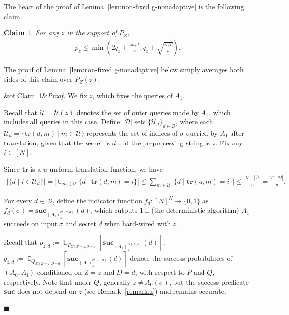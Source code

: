 \documentclass[11pt]{article}
\renewenvironment{proof}[1][]
    {\noindent
       \ifx&#1&{\it Proof.}
       \else{\it Proof ({#1}).}
       \fi}{\hfill $\blacksquare$}
\newtheorem{claim}[theorem]{Claim}
\DeclareMathOperator*{\E}{\mathbb{E}}
\newcommand{\SECS}{{\mathcal{D}}}
\newcommand{\secv}{{d}}
\newcommand{\SECV}{{D}}
\newcommand{\SUC}{\boldsymbol{suc}}
\newcommand{\TR}{\boldsymbol{tr}}
\begin{document}
The heart of the proof of Lemma~\ref{lem:non-fixed g-nonadaptive} is the following claim.
\begin{claim} \label{clm:non-fixed main-eq2}
For any $z$ in the support of $P_{Z}$,
\begin{align*} 
p_{z}
\leq 
\min \left(2 q_{z} 
+ 
\frac{4 \kappa_{z} T }{u},
q_{z} + \sqrt{\frac{\kappa_{z} T }{u}} \right).
\end{align*}
\end{claim}
The proof of Lemma~\ref{lem:non-fixed g-nonadaptive} below simply averages both sides of this claim over $P_{Z}(z)$.

\medskip

\begin{proof}[of Claim~\ref{clm:non-fixed main-eq2}]
We fix $z$, which fixes the queries of $A_1$.

Recall that $\mathcal{U} = \mathcal{U}(z)$ denotes the set of outer queries made by $A_1$, which includes all queries in this case. Define $|\SECS|$ sets $\{\mathcal{U}_\secv\}_{\secv \in \SECS}$,
where each $\mathcal{U}_\secv = \{ \TR(\secv,m) \mid m \in \mathcal{U}\}$ represents the set of indices of $\sigma$ queried by $A_1$ after translation, given that the secret is $\secv$ and the preprocessing string is $z$.
Fix any $i \in [N]$.

Since $\TR$ is a $u$-uniform translation function, we have
\begin{align} \label{eq:non-fixed readt2}
|\{\secv \mid i \in \mathcal{U}_\secv\}|
= | \cup_{m \in \mathcal{U}} \{ \secv \mid \TR(\secv,m) = i \} |
\leq \sum_{m \in \mathcal{U}} | \{ \secv \mid \TR(\secv,m) = i \} |
\le \frac{|\mathcal{U}| \cdot |\SECS|}{u} = \frac{T \cdot |\SECS|}{u}.
\end{align}



For every $\secv \in \SECS$, define the indicator function $f_\secv:[N]^{N} \to \{0,1\}$
as 
$f_\secv(\sigma) = 
\SUC_{(A_1)_{z}^{\mathcal{O}(\sigma,\secv)}}(\secv)$,
which outputs $1$ if
(the deterministic algorithm) $A_1$ succeeds on input $\sigma$ and secret $\secv$ when hard-wired with $z$. 

Recall that 
$p_{z,\secv} := \E_{P_{\Sigma \mid Z=z, \SECV = \secv}}[\SUC_{(A_1)_{z}^{\mathcal{O}(\Sigma,\secv)}}(\secv)]$, 
$q_{z,\secv} := 
\E_{Q_{\Sigma \mid Z=z, \SECV = \secv}}[\SUC_{(A_1)_{z}^{\mathcal{O}(\Sigma,\secv)}}(\secv) ]$
denote the success probabilities of $(A_0,A_1)$ conditioned on $Z=z$ and $\SECV=\secv$, with respect to $P$ and $Q$, respectively. Note that under $Q$, generally $z \neq A_0(\sigma)$,
but the success predicate $\SUC$ does not depend on $z$ (see Remark~\ref{remark:z}) and remains accurate.


\end{proof}
\end{document}
